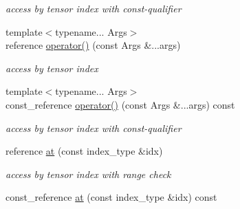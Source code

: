 \begin{DoxyCompactItemize}
\begin{DoxyCompactList}\small\item\em access by tensor index with const-\/qualifier \item\end{DoxyCompactList}\item 
\hypertarget{classbtas_1_1_tensor_wrapper_3_01_t_01_5_00_01_n_00_01_order_01_4_aeb295bf2108de72a1c4b3b4bc0fa15bd}{
{\footnotesize template$<$typename... Args$>$ }\\reference \hyperlink{classbtas_1_1_tensor_wrapper_3_01_t_01_5_00_01_n_00_01_order_01_4_aeb295bf2108de72a1c4b3b4bc0fa15bd}{operator()} (const Args \&...args)}
\label{classbtas_1_1_tensor_wrapper_3_01_t_01_5_00_01_n_00_01_order_01_4_aeb295bf2108de72a1c4b3b4bc0fa15bd}

\begin{DoxyCompactList}\small\item\em access by tensor index \item\end{DoxyCompactList}\item 
\hypertarget{classbtas_1_1_tensor_wrapper_3_01_t_01_5_00_01_n_00_01_order_01_4_afe393130e8499b857b57f57cc8ca7c29}{
{\footnotesize template$<$typename... Args$>$ }\\const\_\-reference \hyperlink{classbtas_1_1_tensor_wrapper_3_01_t_01_5_00_01_n_00_01_order_01_4_afe393130e8499b857b57f57cc8ca7c29}{operator()} (const Args \&...args) const }
\label{classbtas_1_1_tensor_wrapper_3_01_t_01_5_00_01_n_00_01_order_01_4_afe393130e8499b857b57f57cc8ca7c29}

\begin{DoxyCompactList}\small\item\em access by tensor index with const-\/qualifier \item\end{DoxyCompactList}\item 
\hypertarget{classbtas_1_1_tensor_wrapper_3_01_t_01_5_00_01_n_00_01_order_01_4_a0245345ce6dbe67540530fca5c0b1fd8}{
reference \hyperlink{classbtas_1_1_tensor_wrapper_3_01_t_01_5_00_01_n_00_01_order_01_4_a0245345ce6dbe67540530fca5c0b1fd8}{at} (const index\_\-type \&idx)}
\label{classbtas_1_1_tensor_wrapper_3_01_t_01_5_00_01_n_00_01_order_01_4_a0245345ce6dbe67540530fca5c0b1fd8}

\begin{DoxyCompactList}\small\item\em access by tensor index with range check \item\end{DoxyCompactList}\item 
\hypertarget{classbtas_1_1_tensor_wrapper_3_01_t_01_5_00_01_n_00_01_order_01_4_a79041b377a78b00d85c1f051903994d2}{
const\_\-reference \hyperlink{classbtas_1_1_tensor_wrapper_3_01_t_01_5_00_01_n_00_01_order_01_4_a79041b377a78b00d85c1f051903994d2}{at} (const index\_\-type \&idx) const }
\label{classbtas_1_1_tensor_wrapper_3_01_t_01_5_00_01_n_00_01_order_01_4_a79041b377a78b00d85c1f051903994d2}


\end{DoxyCompactItemize}
